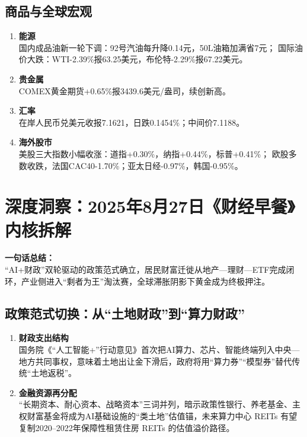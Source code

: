\subsection{商品与全球宏观}
\begin{enumerate}[leftmargin=*, nosep]
    \item \textbf{能源}  \\
    国内成品油新一轮下调：92号汽油每升降0.14元，50L油箱加满省7元；  
    国际油价大跌：WTI-2.39\%报63.25美元，布伦特-2.29\%报67.22美元。
    \item \textbf{贵金属}  \\
    COMEX黄金期货+0.65\%报3439.6美元/盎司，续创新高。
    \item \textbf{汇率}  \\
    在岸人民币兑美元收报7.1621，日跌0.1454\%；中间价7.1188。
    \item \textbf{海外股市}  \\
    美股三大指数小幅收涨：道指+0.30\%，纳指+0.44\%，标普+0.41\%；  
    欧股多数收跌，法国CAC40-1.70\%；亚太日经-0.97\%，韩国-0.95\%。
\end{enumerate}


\section{深度洞察：2025年8月27日《财经早餐》内核拆解}
\textbf{一句话总结：}  \\
“AI+财政”双轮驱动的政策范式确立，居民财富迁徙从地产—理财—ETF完成闭环，产业侧进入“剩者为王”淘汰赛，全球滞胀阴影下黄金成为终极押注。

\subsection{政策范式切换：从“土地财政”到“算力财政”}
\begin{enumerate}[leftmargin=*, nosep]
    \item \textbf{财政支出结构}  \\
    国务院《“人工智能+”行动意见》首次把AI算力、芯片、智能终端列入中央—地方共同事权，意味着土地出让金下滑后，{\color{red}政府将用“算力券”“模型券”替代传统“土地返税”}。  
    \item \textbf{金融资源再分配}  \\
   {\color{red} “长期资本、耐心资本、战略资本”三词并列，暗示政策性银行、养老基金、主权财富基金将成为AI基础设施的“类土地”估值锚}，未来算力中心 REITs 有望复制2020–2022年保障性租赁住房 REITs 的估值溢价路径。
\end{enumerate}

